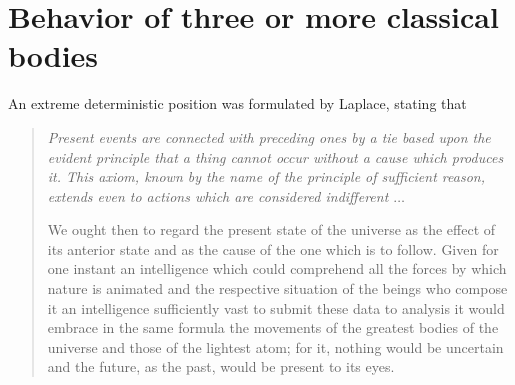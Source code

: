 \documentclass[rmp,amsfonts,showpacs,showkeys]{revtex4}
\begin{document}
\section{Behavior of three or more classical bodies}

An extreme deterministic position
was formulated by Laplace,  stating that \cite[Chapter II]{laplace-prob}
\begin{quote}
{\em
Present events are connected with preceding ones
by a tie based upon the evident principle that a thing
cannot occur without a cause which produces it. This
axiom, known by the name of the principle of sufficient
reason, extends even to actions which are considered
indifferent $\ldots$


We ought then to regard the present state of the
universe as the effect of its anterior state and as the
cause of the one which is to follow. Given for one
instant an intelligence which could comprehend all the
forces by which nature is animated and the respective
situation of the beings who compose it an intelligence
sufficiently vast to submit these data to analysis it
would embrace in the same formula the movements of
the greatest bodies of the universe and those of the
lightest atom; for it, nothing would be uncertain and
the future, as the past, would be present to its eyes.
}
\end{quote}
\end{document}
